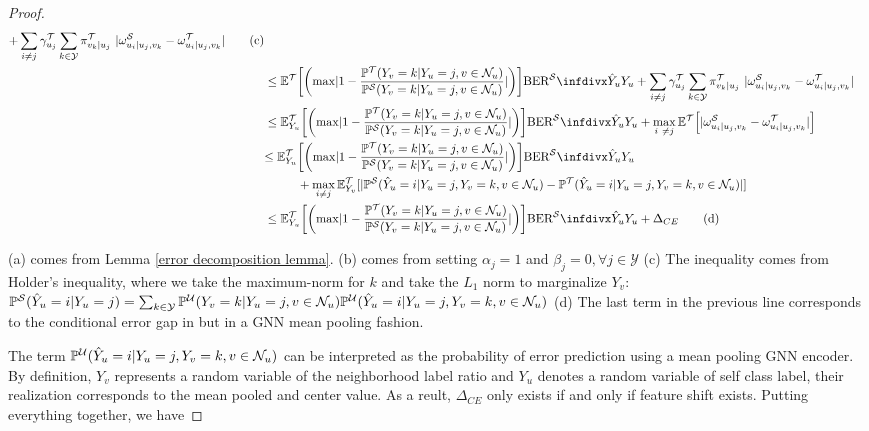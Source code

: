 \begin{proof}
\begin{align*}
    + 
    \sum_{i\neq j} \gammat{u_j}\sum_{k\in\mathcal{Y}}
   \pit{v_k|u_j}\
    \abs{\omegas{u_i|u_j,v_k}
    - 
    \omegat{u_i|u_j,v_k}}    
    \tag{c}\\
    &\leq \E^\gT\spar*{\rpar*{\max \abs{1-\frac{\probt(Y_v=k|Y_u=j,v\in \neighbor_u)}{\probs(Y_v=k|Y_u=j,v\in \neighbor_u)}}}}  \balerrorrate{\predy_u}{\rvY_u}
    + 
    \sum_{i\neq j} \gammat{u_j}\sum_{k\in\mathcal{Y}}
   \pit{v_k|u_j}\
    \abs{\omegas{u_i|u_j,v_k}
    - 
    \omegat{u_i|u_j,v_k}}
    \\
    &\leq \E_{Y_u}^\gT\spar*{\rpar*{\max \abs{1-\frac{\probt(Y_v=k|Y_u=j,v\in \neighbor_u)}{\probs(Y_v=k|Y_u=j,v\in \neighbor_u)}}}}  \balerrorrate{\predy_u}{\rvY_u}
    + 
    \max_{i\
    \neq j}\E^\gT\spar*{|\omegas{u_i|u_j,v_k} - \omegat{u_i|u_j,v_k} |}
    \\
    &\begin{aligned}[t]
    \leq \E_{Y_u}^\gT&\spar*{\rpar*{\max \abs{1-\frac{\probt(Y_v=k|Y_u=j,v\in \neighbor_u)}{\probs(Y_v=k|Y_u=j,v\in \neighbor_u)}}}}  \balerrorrate{\predy_u}{\rvY_u}\\
    &+ \max_{i\neq j}\E^\gT_{\rvY_{v}}\spar{|\probs(\predy_u=i| \rvY_u=j, \rvY_{v}=k, v\in \neighbor_u)
    - \probt(\predy_u=i| \rvY_u=j, \rvY_{v}=k, v\in \neighbor_u) |}
    \end{aligned}
    \\
    &\leq \E_{Y_u}^\gT\spar*{\rpar*{\max \abs{1-\frac{\probt(Y_v=k|Y_u=j,v\in \neighbor_u)}{\probs(Y_v=k|Y_u=j,v\in \neighbor_u)}}}}  \balerrorrate{\predy_u}{\rvY_u} + \Delta_{CE} \tag{d}
\end{align*}


(a) comes from Lemma \ref{error decomposition lemma}. (b) comes from setting $\alpha_j=1$ and $\beta_j=0, \forall j \in \mathcal{Y}$
(c) The inequality comes from Holder's inequality, where we take the maximum-norm for $k$ and take the $L_1$ norm to marginalize $Y_v$: $\mathbb{P}^\mathcal{S}(\hat{Y}_u=i| Y_u=j) =\sum_{k\in\mathcal{Y}}  \mathbb{P}^\mathcal{U}(Y_{v}=k | Y_u=j, v\in \mathcal{N}_u )\mathbb{P}^\mathcal{U}(\hat{Y}_u=i| Y_u=j, Y_{v}=k, v\in \mathcal{N}_u)$
(d) The last term in the previous line corresponds to the conditional error gap in \cite{tachet2020domain} but in a GNN mean pooling fashion.

The term $\mathbb{P}^\mathcal{U}(\hat{Y}_u=i| Y_u=j, Y_{v}=k, v\in \mathcal{N}_u)$ can be interpreted as the probability of error prediction using a mean pooling GNN encoder.
By definition, $Y_v$ represents a random variable of the neighborhood label ratio and $Y_u$ denotes a random variable of self class label, their realization corresponds to the mean pooled and center value.
As a reult, $\Delta_{CE}$ only exists if and only if feature shift exists. Putting everything together, we have


\end{proof}

